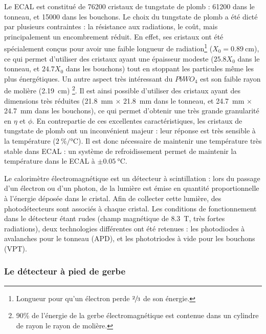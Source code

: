 Le ECAL est constitué de 76200 cristaux de tungstate de plomb : 61200 dans le tonneau, et 15000 dans les bouchons. Le choix du tungstate de plomb a été dicté par plusieurs contraintes : la résistance aux radiations, le coût, mais principalement un encombrement réduit. En effet, ses cristaux ont été spécialement conçus pour avoir une faible longueur de radiation\footnote{Longueur pour qu'un électron perde $\sfrac{2}{3}$ de son énergie.} ($X_0 = \SI{0.89}{\cm}$), ce qui permet d'utiliser des cristaux ayant une épaisseur modeste ($\num{25.8}X_0$ dans le tonneau, et $\num{24.7}X_0$ dans les bouchons) tout en stoppant les particules même les plus énergétiques. Un autre aspect très intéressant du $PbWO_4$ est son faible rayon de molière (\SI{2.19}{\cm}) \footnote{90\% de l'énergie de la gerbe électromagnétique est contenue dans un cylindre de rayon le rayon de molière.}. Il est ainsi possible d'utiliser des cristaux ayant des dimensions très réduites (\SI{21.8}{\mm} $\times$ \SI{21.8}{\mm} dans le tonneau, et \SI{24.7}{\mm} $\times$ \SI{24.7}{\mm} dans les bouchons), ce qui permet d'obtenir une très grande granularité en $\eta$ et $\phi$.
En contrepartie de ces excellentes caractéristiques, les cristaux de tungstate de plomb ont un inconvénient majeur : leur réponse est très sensible à la température (\tilde $\SI[per-mode = symbol]{2}{\percent\per\degreeCelsius}$). Il est donc nécessaire de maintenir une température très stable dans ECAL : un système de refroidissement permet de maintenir la température dans le ECAL à $\pm \SI{0.05}{\degreeCelsius}$.

\medskip

Le calorimètre électromagnétique est un détecteur à scintillation : lors du passage d'un électron ou d'un photon, de la lumière est émise en quantité proportionnelle à l'énergie déposée dans le cristal. Afin de collecter cette lumière, des photodétecteurs sont associés à chaque cristal. Les conditions de fonctionnement dans le détecteur étant rudes (champ magnétique de \SI{8.3}{\tesla}, très fortes radiations), deux technologies différentes ont été retenues : les photodiodes à avalanches pour le tonneau (APD), et les phototriodes à vide pour les bouchons (VPT).

\subsubsection{Le détecteur à pied de gerbe}

